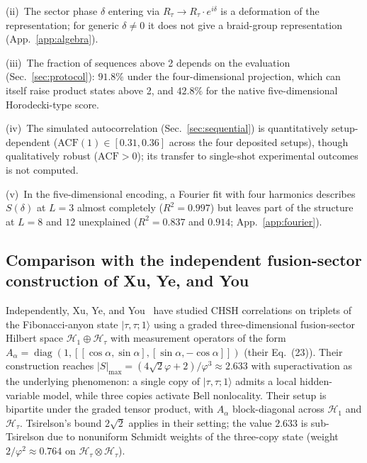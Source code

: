 \documentclass[aps,pra,twocolumn,superscriptaddress,longbibliography,floatfix,nofootinbib]{revtex4-2}
\begin{document}
(ii)~The sector phase $\delta$ entering via $R_\tau\to R_\tau\cdot
e^{i\delta}$ is a deformation of the representation; for generic $\delta
\neq 0$ it does not give a braid-group representation
(App.~\ref{app:algebra}).

(iii)~The fraction of sequences above 2 depends on the evaluation
(Sec.~\ref{sec:protocol}): $91.8\%$ under the four-dimensional
projection, which can itself raise product states above 2, and $42.8\%$
for the native five-dimensional Horodecki-type score.

(iv)~The simulated autocorrelation (Sec.~\ref{sec:sequential}) is
quantitatively setup-dependent ($\text{ACF}(1)\in [0.31,0.36]$ across
the four deposited setups), though qualitatively robust
($\text{ACF}>0$); its transfer to single-shot experimental outcomes is
not computed.

(v)~In the five-dimensional encoding, a Fourier fit with four
harmonics describes $S(\delta)$ at $L=3$ almost completely
($R^2=0.997$) but leaves part of the structure at $L=8$ and $12$
unexplained ($R^2=0.837$ and $0.914$; App.~\ref{app:fourier}).

\subsection{Comparison with the independent fusion-sector construction of Xu, Ye, and You}
\label{sec:xuyeyou_comparison}

Independently, Xu, Ye, and You~\cite{Xu2025}
have studied CHSH correlations on triplets of the Fibonacci-anyon
state $|\tau,\tau;1\rangle$ using a graded three-dimensional
fusion-sector Hilbert space $\mathcal{H}_1 \oplus \mathcal{H}_\tau$
with measurement operators of the form $A_\alpha = \operatorname{diag}(1,
[[\cos\alpha,\sin\alpha],[\sin\alpha,-\cos\alpha]])$ (their Eq.~(23)).
Their construction reaches
$|S|_{\max} = (4\sqrt{2}\varphi + 2)/\varphi^3 \approx 2.633$
with superactivation as the underlying phenomenon: a single copy of
$|\tau,\tau;1\rangle$ admits a local hidden-variable model, while three
copies activate Bell nonlocality. Their setup is bipartite under the
graded tensor product, with $A_\alpha$ block-diagonal across
$\mathcal{H}_1$ and $\mathcal{H}_\tau$. Tsirelson's bound $2\sqrt{2}$
applies in their setting; the value $2.633$ is sub-Tsirelson due to
nonuniform Schmidt weights of the three-copy state
(weight $2/\varphi^2 \approx 0.764$ on $\mathcal{H}_\tau \otimes \mathcal{H}_\tau$).
\end{document}
